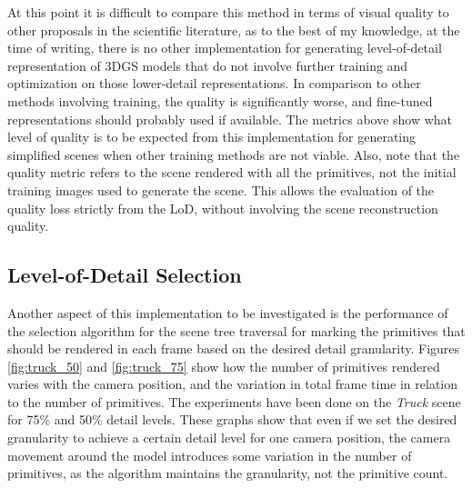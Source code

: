 At this point it is difficult to compare this method in terms of visual quality to other proposals in the scientific literature, as to the best of my knowledge, at the time of writing, there is no other implementation for generating level-of-detail representation of 3DGS models that do not involve further training and optimization on those lower-detail representations. In comparison to other methods involving training, the quality is significantly worse, and fine-tuned representations should probably used if available. The metrics above show what level of quality is to be expected from this implementation for generating simplified scenes when other training methods are not viable. Also, note that the quality metric refers to the scene rendered with all the primitives, not the initial training images used to generate the scene. This allows the evaluation of the quality loss strictly from the LoD, without involving the scene reconstruction quality.

\subsection{Level-of-Detail Selection}
Another aspect of this implementation to be investigated is the performance of the selection algorithm for the scene tree traversal for marking the primitives that should be rendered in each frame based on the desired detail granularity. Figures \ref{fig:truck_50} and \ref{fig:truck_75} show how the number of primitives rendered varies with the camera position, and the variation in total frame time in relation to the number of primitives. The experiments have been done on the \textit{Truck} scene for 75\% and 50\% detail levels. These graphs show that even if we set the desired granularity to achieve a certain detail level for one camera position, the camera movement around the model introduces some variation in the number of primitives, as the algorithm maintains the granularity, not the primitive count.

\begin{figure}[H]
\end{figure}

